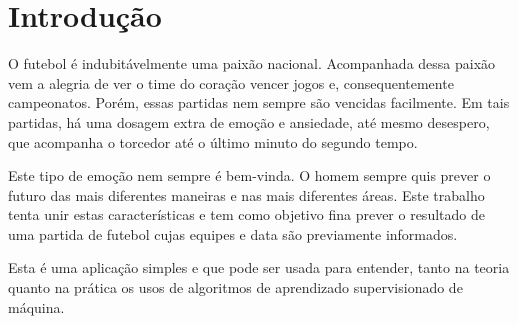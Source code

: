 


\section{Introdução}\label{sec:introducao}



O futebol é indubitávelmente uma paixão nacional. Acompanhada dessa paixão vem a alegria de ver o time do coração vencer jogos e, consequentemente campeonatos. Porém, essas partidas nem sempre são vencidas facilmente. Em tais partidas, há uma dosagem extra de emoção e ansiedade, até mesmo desespero, que acompanha o torcedor até o último minuto do segundo tempo.

Este tipo de emoção nem sempre é bem-vinda. O homem sempre quis prever o futuro das mais diferentes maneiras e nas mais diferentes áreas. Este trabalho tenta unir estas características e tem como objetivo fina prever o resultado de uma partida de futebol cujas equipes e data são previamente informados. 

Esta é uma aplicação simples e que pode ser usada para entender, tanto na teoria quanto na prática os usos de algoritmos de aprendizado supervisionado de máquina.
